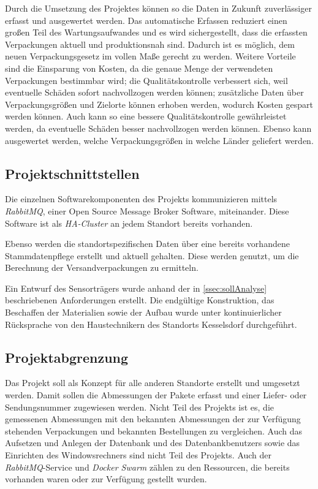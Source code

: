 Durch die Umsetzung des Projektes können so die Daten in Zukunft zuverlässiger erfasst und ausgewertet werden. Das automatische Erfassen reduziert einen großen Teil des Wartungsaufwandes und es wird sichergestellt, dass die erfassten Verpackungen aktuell und produktionsnah sind. Dadurch ist es möglich, dem neuen Verpackungsgesetz im vollen Maße gerecht zu werden. Weitere Vorteile sind die Einsparung von Kosten, da die genaue Menge der verwendeten Verpackungen bestimmbar wird; die Qualitätskontrolle verbessert sich, weil eventuelle Schäden sofort nachvollzogen werden können; zusätzliche Daten über Verpackungsgrößen und Zielorte können erhoben werden, wodurch Kosten gespart werden können. Auch kann so eine bessere Qualitätskontrolle gewährleistet werden, da eventuelle Schäden besser nachvollzogen werden können. Ebenso kann ausgewertet werden, welche Verpackungsgrößen in welche Länder geliefert werden.


\subsection{Projektschnittstellen}

Die einzelnen Softwarekomponenten des Projekts kommunizieren mittels \textit{\gls{RabbitMQ}}, einer Open Source Message Broker Software, miteinander. Diese Software ist als \textit{\gls{HA-Cluster}} an jedem Standort bereits vorhanden.

Ebenso werden die standortspezifischen Daten über eine bereits vorhandene Stammdatenpflege erstellt und aktuell gehalten. Diese werden genutzt, um die Berechnung der Versandverpackungen zu ermitteln.

Ein Entwurf des Sensorträgers wurde anhand der in \vref{ssec:sollAnalyse} beschriebenen Anforderungen erstellt. Die endgültige Konstruktion, das Beschaffen der Materialien sowie der Aufbau wurde unter kontinuierlicher Rücksprache von den Haustechnikern des Standorts Kesselsdorf durchgeführt.


\subsection{Projektabgrenzung}

Das Projekt soll als Konzept für alle anderen Standorte erstellt und umgesetzt werden. Damit sollen die Abmessungen der Pakete erfasst und einer Liefer- oder Sendungsnummer zugewiesen werden. Nicht Teil des Projekts ist es, die gemessenen Abmessungen mit den bekannten Abmessungen der zur Verfügung stehenden Verpackungen und bekannten Bestellungen zu vergleichen. Auch das Aufsetzen und Anlegen der Datenbank und des Datenbankbenutzers sowie das Einrichten des Windowsrechners sind nicht Teil des Projekts. Auch der \textit{\gls{RabbitMQ}}-Service und \textit{\gls{Docker Swarm}} zählen zu den Ressourcen, die bereits vorhanden waren oder zur Verfügung gestellt wurden.